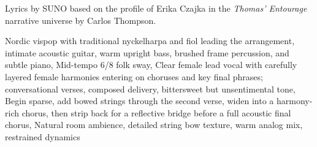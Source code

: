
\begin{notes}
Lyrics by SUNO based on the profile of Erika Czajka in the \emph{Thomas’ Entourage} narrative universe by Carlos Thompson.
\end{notes}
\begin{style}
Nordic vispop with traditional nyckelharpa and fiol leading the arrangement, intimate acoustic guitar, warm upright bass, brushed frame percussion, and subtle piano, Mid-tempo 6/8 folk sway, Clear female lead vocal with carefully layered female harmonies entering on choruses and key final phrases; conversational verses, composed delivery, bittersweet but unsentimental tone, Begin sparse, add bowed strings through the second verse, widen into a harmony-rich chorus, then strip back for a reflective bridge before a full acoustic final chorus, Natural room ambience, detailed string bow texture, warm analog mix, restrained dynamics
\end{style}
